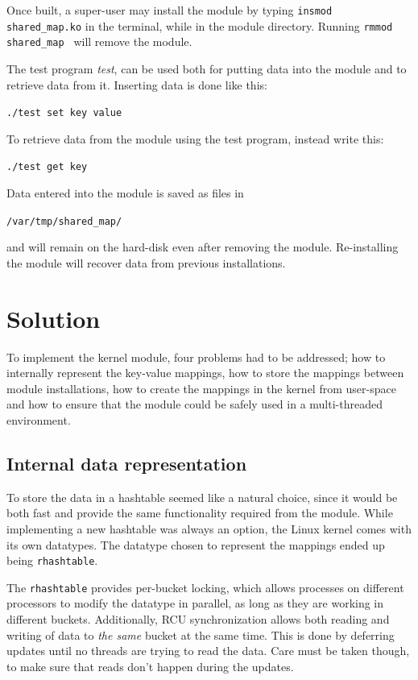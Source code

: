 \documentclass[final,a4paper]{article}
\begin{document}
Once built, a super-user may install the module by typing 
{\tt insmod shared\_map.ko} in the terminal, while in the module directory.
Running {\tt rmmod shared\_map } will remove the module.

The test program \emph{test}, can be used both for putting data
into the module and to retrieve data from it. Inserting data is done like this:
\begin{center}
{\tt ./test set key value}
\end{center}
To retrieve data from the module using the test program, instead write this:
\begin{center}
{\tt ./test get key}
\end{center}

Data entered into the module is saved as files in
\begin{center}
{\texttt{/var/tmp/shared\_map/}}
\end{center}
and will remain on the hard-disk even after removing the module. Re-installing
the module will recover data from previous installations.

\section*{Solution}
To implement the kernel module, four problems had to be addressed;
how to internally represent the key-value mappings, how to store the mappings
between module installations, how to create the mappings in the kernel from
user-space and how to ensure that the module could be safely used in a
multi-threaded environment.

\subsection*{Internal data representation}
To store the data in a hashtable seemed like a natural choice, since it would
be both fast and provide the same functionality required from the module. While
implementing a new hashtable was always an option, the Linux kernel comes with
its own datatypes. The datatype chosen to represent the mappings ended up being
\texttt{rhashtable}.

The \texttt{rhashtable} provides per-bucket locking, which allows processes
on different processors to modify the datatype in parallel, as long as they are
working in different buckets. Additionally, RCU synchronization allows both
reading and writing of data to \emph{the same} bucket at the same time. This is
done by deferring updates until no threads are trying to read the data. Care
must be taken though, to make sure that reads don't happen during the updates.
\end{document}
